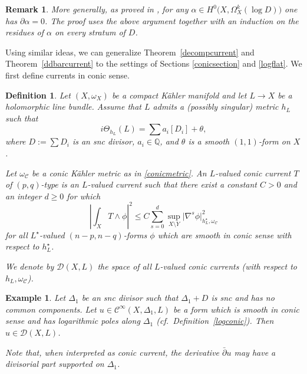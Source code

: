\documentclass[english]{amsart}
\newcommand{\cC}{\mathcal{C}}
\renewcommand{\ge}{\geqslant}
\renewcommand{\le}{\leqslant}
\newcommand{\dbar}{\bar \partial}
\newtheorem{exemple}[thm]{Example}
\newtheorem{defn}[thm]{Definition}
\newtheorem{remark}[thm]{Remark}
\numberwithin{equation}{thm}
\begin{document}
\begin{remark}
	More generally, as proved in \cite{Del71,Nog95}, for any $\alpha \in H^0\bigl(X,\Omega_X^k(\log D)\bigr)$ one has $\partial \alpha = 0$. The proof uses the above argument together with an induction on the residues of $\alpha$ on every stratum of $D$.
\end{remark}

\medskip

Using similar ideas, we can generalize Theorem~\ref{decompcurrent} and Theorem~\ref{ddbarcurrent} to the settings of Sections \ref{conicsection} and \ref{logflat}. We first define currents in conic sense.

\begin{defn}\label{currents}
	Let $(X,\omega_X)$ be a compact K\"ahler manifold and let $L\to X$ be a holomorphic line bundle. Assume that $L$ admits a (possibly singular) metric $h_L$ such that
	\begin{equation}
		i\Theta_{h_L}(L)=\sum a_i [D_i] + \theta,
	\end{equation}
	where $D:=\sum D_i$ is an snc divisor, $a_i\in \mathbb Q$, and $\theta$ is a smooth $(1,1)$-form on $X$.
	
	Let $\omega_{\cC}$ be a conic K\"ahler metric as in \eqref{conicmetric}.
	An $L$-valued conic current $T$ of $(p,q)$-type is an $L$-valued current such that there exist a constant $C>0$ and an integer $d\ge 0$ for which
	\begin{equation}\label{deck5}
		\left|\int_X T\wedge \phi\right|^2
		\le C \sum_{s=0}^d \sup_{X\setminus Y} \bigl|\nabla^s \phi\bigr|^2_{h_L^\star,\omega_{\cC}}
	\end{equation}
	for all $L^\star$-valued $(n-p,n-q)$-forms $\phi$ which are smooth in conic sense with respect to $h_L^\star$.
	
	We denote by $\mathcal{D}(X,L)$ the space of all $L$-valued conic currents (with respect to $h_L, \omega_\cC$).
\end{defn}

\begin{exemple}\label{imporantex}
	Let $\Delta_1$ be an snc divisor such that $\Delta_1 + D$ is snc and has no common components.
	Let $u \in \mathcal{C}^\infty(X,\Delta_1,L)$ be a form which is smooth in conic sense and has logarithmic poles along $\Delta_1$ (cf.\ Definition~\ref{logconic}). Then $u\in \mathcal{D}(X,L)$.
	
	Note that, when interpreted as conic current, the derivative $\dbar u$ may have a divisorial part supported on $\Delta_1$.
\end{exemple}
\end{document}
